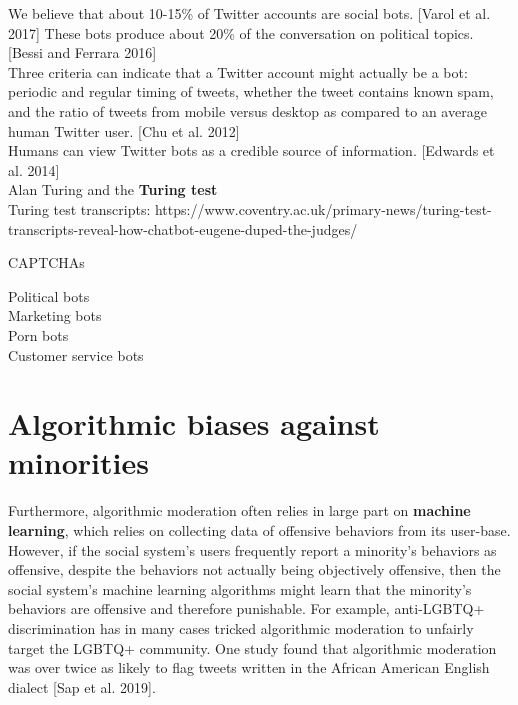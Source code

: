 \documentclass[class=book, crop=false]{standalone}
\providecommand{\keyterm}[1]{\textbf{#1}\marginnote{\scriptsize \textbf{#1}}}
\begin{document}
We believe that about 10-15\% of Twitter accounts are social bots. [Varol et al. 2017] These bots produce about 20\% of the conversation on political topics. [Bessi and Ferrara 2016]\\

Three criteria can indicate that a Twitter account might actually be a bot: periodic and regular timing of tweets, whether the tweet contains known spam, and the ratio of tweets from mobile versus desktop as compared to an average human Twitter user. [Chu et al. 2012]\\

Humans can view Twitter bots as a credible source of information. [Edwards et al. 2014]\\

Alan Turing and the \keyterm{Turing test}\\
Turing test transcripts: https://www.coventry.ac.uk/primary-news/turing-test-transcripts-reveal-how-chatbot-eugene-duped-the-judges/

CAPTCHAs

Political bots\\

Marketing bots\\

Porn bots\\

Customer service bots

\section{Algorithmic biases against minorities}

Furthermore, algorithmic moderation often relies in large part on \keyterm{machine learning}, which relies on collecting data of offensive behaviors from its user-base. However, if the social system's users frequently report a minority's behaviors as offensive, despite the behaviors not actually being objectively offensive, then the social system's machine learning algorithms might learn that the minority's behaviors are offensive and therefore punishable. For example, anti-LGBTQ+ discrimination has in many cases tricked algorithmic moderation to unfairly target the LGBTQ+ community. One study found that algorithmic moderation was over twice as likely to flag tweets written in the African American English dialect [Sap et al. 2019].
\end{document}
